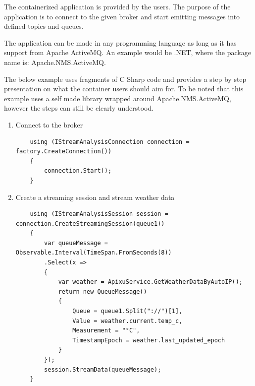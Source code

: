 The containerized application is provided by the users. The purpose of the application is to connect to the given broker and start emitting messages into defined topics and queues.

The application can be made in any programming language as long as it has support from Apache ActiveMQ. An example would be .NET, where the package name is: Apache.NMS.ActiveMQ.

The below example uses fragments of C Sharp code and provides a step by step presentation on what the container users should aim for. To be noted that this example uses a self made library wrapped around Apache.NMS.ActiveMQ, however the steps can still be clearly understood.

\begin{enumerate}
	\item Connect to the broker

	\begin{lstlisting}
	using (IStreamAnalysisConnection connection = factory.CreateConnection())
	{
		connection.Start();
	}
	\end{lstlisting}
	
	\item Create a streaming session and stream weather data
	\begin{lstlisting}
	using (IStreamAnalysisSession session = connection.CreateStreamingSession(queue1))
	{
		var queueMessage = Observable.Interval(TimeSpan.FromSeconds(8))
		.Select(x =>
		{
			var weather = ApixuService.GetWeatherDataByAutoIP();
			return new QueueMessage()
			{
				Queue = queue1.Split("://")[1],
				Value = weather.current.temp_c,
				Measurement = "°C",
				TimestampEpoch = weather.last_updated_epoch
			}
		});
		session.StreamData(queueMessage);
	}
	\end{lstlisting}

\end{enumerate}

